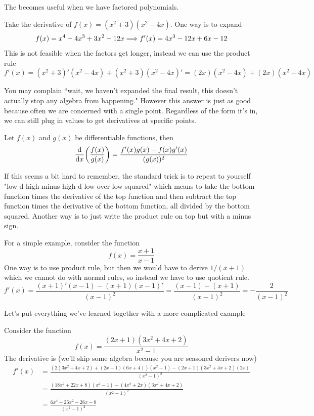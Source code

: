 The becomes useful when we have factored polynomials.

\begin{example}
	Take the derivative of $f(x) = (x^2 + 3)(x^2 - 4x)$. One way is to expand
	\[ f(x) = x^4 -4x^3 + 3x^2 - 12x \Longrightarrow f'(x) = 4x^3 - 12x + 6x - 12 \]
	This is not feasible when the factors get longer, instead we can use the product rule
	\[ f'(x) = (x^2 +3)'(x^2 - 4x) + (x^2 + 3)(x^2 - 4x)' = (2x)(x^2 - 4x) + (2x)(x^2 - 4x) \]
\end{example}

You may complain ``wait, we haven't expanded the final result, this doesn't actually stop any algebra from happening." However this answer is just as good because often we are concerned with a single point. Regardless of the form it's in, we can still plug in values to get derivatives at specific points.

\begin{theorem}
	Let $f(x)$ and $g(x)$ be differentiable functions, then
	\[ \dv{x}(\frac{f(x)}{g(x)}) = \frac{f'(x)g(x) - f(x)g'(x)}{(g(x))^2} \]
\end{theorem}

If this seems a bit hard to remember, the standard trick is to repeat to yourself "low d high minus high d low over low squared" which means to take the bottom function times the derivative of the top function and then subtract the top function times the derivative of the bottom function, all divided by the bottom squared. Another way is to just write the product rule on top but with a minus sign.

\begin{example}
	For a simple example, consider the function
	\[ f(x) = \frac{x + 1}{x - 1} \]
	One way is to use product rule, but then we would have to derive $1/(x+1)$ which we cannot do with normal rules, so instead we have to use quotient rule.
	\[ f'(x) = \frac{(x + 1)'(x - 1) - (x + 1)(x - 1)'}{(x - 1)^2} = \frac{(x - 1) - (x + 1)}{(x - 1)^2} = -\frac{2}{(x - 1)^2}\]
\end{example}

Let's put everything we've learned together with a more complicated example

\begin{example}
	Consider the function
	\[ f(x) = \frac{(2x + 1)(3x^2 + 4x + 2)}{x^2 - 1} \]
	The derivative is (we'll skip some algebra because you are seasoned derivers now)
	\begin{align*}
		f'(x) &= \frac{(2(3x^2 + 4x + 2) + (2x + 1)(6x + 4))(x^2 - 1) - (2x + 1)(3x^2 + 4x + 2)(2x)}{(x^2 - 1)^2} \\
		&= \frac{(18x^2 + 22x + 8)(x^2 - 1) - (4x^2 + 2x)(3x^2 + 4x + 2)}{(x^2 - 1)^2} \\
		&= \frac{6x^4 - 26x^2 - 26x - 8}{(x^2 - 1)^2}
	\end{align*}
\end{example}

